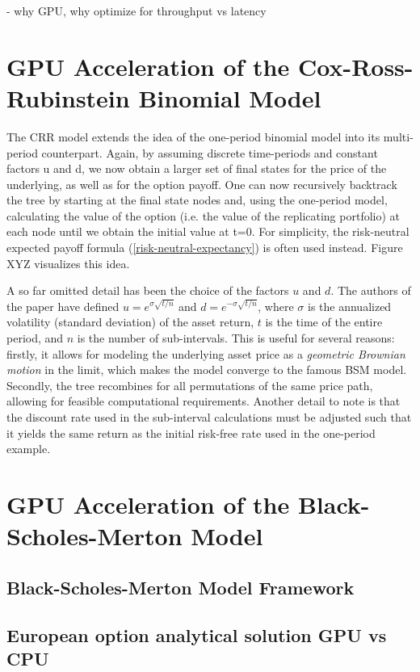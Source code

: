 \documentclass[english,12pt,a4paper,pdftex,sci,utf8]{aaltothesis}
\begin{document}
- why GPU, why optimize for throughput vs latency


\clearpage

\section{GPU Acceleration of the Cox-Ross-Rubinstein Binomial Model} \label{sec:gpu-crr}

The CRR model extends the idea of the one-period binomial model into its multi-period counterpart. Again, by assuming discrete time-periods and constant factors u and d, we now obtain a larger set of final states for the price of the underlying, as well as for the option payoff. One can now recursively backtrack the tree by starting at the final state nodes and, using the one-period model, calculating the value of the option (i.e. the value of the replicating portfolio) at each node until we obtain the initial value at t=0. For simplicity, the risk-neutral expected payoff formula (\ref{risk-neutral-expectancy}) is often used instead. Figure XYZ visualizes this idea. \cite{cox1979option}

A so far omitted detail has been the choice of the factors $u$ and $d$. The authors of the paper have defined $u = e^{\sigma\sqrt{t/n}}$ and $d = e^{-\sigma\sqrt{t/n}}$, where $\sigma$ is the annualized volatility (standard deviation) of the asset return, $t$ is the time of the entire period, and $n$ is the number of sub-intervals. This is useful for several reasons: firstly, it allows for modeling the underlying asset price as a \emph{geometric Brownian motion} in the limit, which makes the model converge to the famous BSM model. Secondly, the tree recombines for all permutations of the same price path, allowing for feasible computational requirements. Another detail to note is that the discount rate used in the sub-interval calculations must be adjusted such that it yields the same return as the initial risk-free rate used in the one-period example.



\section{GPU Acceleration of the Black-Scholes-Merton Model} \label{sec:gpu-bsm}
\subsection{Black-Scholes-Merton Model Framework}
\subsection{European option analytical solution GPU vs CPU}
\end{document}

